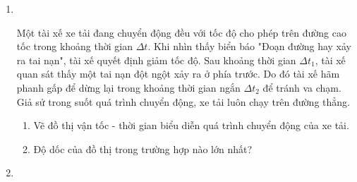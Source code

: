 \begin{enumerate}[label=\bfseries Bài \arabic*:,leftmargin=1.5cm]
	\item {}\\
{Một tài xế xe tải đang chuyển động đều với tốc độ cho phép trên đường cao tốc trong khoảng thời gian $\Delta t$. Khi nhìn thấy biển báo "Đoạn đường hay xảy ra tai nạn", tài xế quyết định giảm tốc độ. Sau khoảng thời gian $\Delta t_1$, tài xế quan sát thấy một tai nạn đột ngột xảy ra ở phía trước. Do đó tài xế hãm phanh gấp để dừng lại trong khoảng thời gian ngắn $\Delta t_2$ để tránh va chạm. Giả sử trong suốt quá trình chuyển động, xe tải luôn chạy trên đường thẳng.
	\begin{enumerate}[label=\alph*)]
		\item Vẽ đồ thị vận tốc - thời gian biểu diễn quá trình chuyển động của xe tải.
		\item Độ dốc của đồ thị trong trường hợp nào lớn nhất?
	\end{enumerate}
}

	
	\item {}
	

\end{enumerate}
